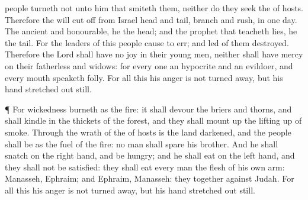 {people
turneth not unto him that
smiteth them, neither do they
seek the
{} of
hosts.
Therefore the
{} will cut
off from
Israel
head and
tail,
branch and
rush, in
one
day.
The
ancient and
honourable,
he
{} the
head; and the
prophet that
teacheth
lies, he
{} the
tail.
For the
leaders of this
people cause
{} to
err; and
{}
led of them
{}
destroyed.
Therefore the
Lord shall have no
joy in their young
men, neither shall have
mercy on their
fatherless and
widows: for every one
{} an
hypocrite and an
evildoer, and every
mouth
speaketh
folly. For all this his
anger is not turned
away, but his
hand
{} stretched out
still.
\par }{\PP {}¶ For
wickedness
burneth as the
fire: it shall
devour the
briers and
thorns, and shall
kindle in the
thickets of the
forest, and they shall mount
up
{} the lifting
up of
smoke.
Through the
wrath of the
{} of
hosts is the
land
darkened, and the
people shall be as the
fuel of the
fire: no
man shall
spare his
brother.
And he shall
snatch on the right
hand, and be
hungry; and he shall
eat on the left
hand, and they shall not be
satisfied: they shall
eat every
man the
flesh of his own
arm:
Manasseh,
Ephraim; and
Ephraim,
Manasseh:
{} they
together
{} against
Judah. For all this his
anger is not turned
away, but his
hand
{} stretched out
still.

}
